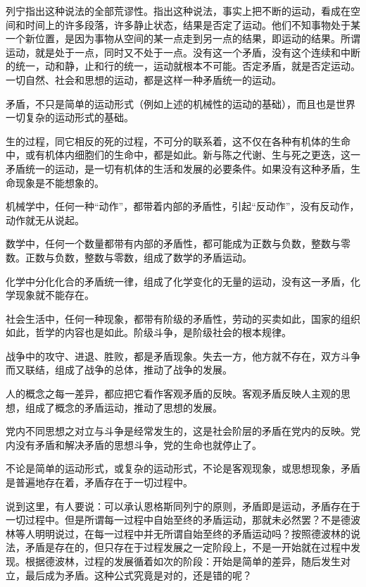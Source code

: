 \documentclass[UTF8, 12pt, a4paper]{ctexrep}
\begin{document}
列宁指出这种说法的全部荒谬性。指出这种说法，事实上把不断的运动，看成在空间和时间上的许多段落，许多静止状态，结果是否定了运动。他们不知事物处于某一个新位置，是因为事物从空间的某一点走到另一点的结果，即运动的结果。所谓运动，就是处于一点，同时又不处于一点。没有这一个矛盾，没有这个连续和中断的统一，动和静，止和行的统一，运动就根本不可能。否定矛盾，就是否定运动。一切自然、社会和思想的运动，都是这样一种矛盾统一的运动。

矛盾，不只是简单的运动形式（例如上述的机械性的运动的基础），而且也是世界一切复杂的运动形式的基础。

生的过程，同它相反的死的过程，不可分的联系着，这不仅在各种有机体的生命中，或有机体内细胞们的生命中，都是如此。新与陈之代谢、生与死之更迭，这一矛盾统一的运动，是一切有机体的生活和发展的必要条件。如果没有这种矛盾，生命现象是不能想象的。

机械学中，任何一种“动作”，都带着内部的矛盾性，引起“反动作”，没有反动作，动作就无从说起。

数学中，任何一个数量都带有内部的矛盾性，都可能成为正数与负数，整数与零数。正数与负数，整数与零数，组成了数学的矛盾运动。

化学中分化化合的矛盾统一律，组成了化学变化的无量的运动，没有这一矛盾，化学现象就不能存在。

社会生活中，任何一种现象，都带有阶级的矛盾性，劳动的买卖如此，国家的组织如此，哲学的内容也是如此。阶级斗争，是阶级社会的根本规律。

战争中的攻守、进退、胜败，都是矛盾现象。失去一方，他方就不存在，双方斗争而又联结，组成了战争的总体，推动了战争的发展。

人的概念之每一差异，都应把它看作客观矛盾的反映。客观矛盾反映人主观的思想，组成了概念的矛盾运动，推动了思想的发展。

党内不同思想之对立与斗争是经常发生的，这是社会阶层的矛盾在党内的反映。党内没有矛盾和解决矛盾的思想斗争，党的生命也就停止了。

不论是简单的运动形式，或复杂的运动形式，不论是客观现象，或思想现象，矛盾是普遍地存在着，矛盾存在于一切过程中。

说到这里，有人要说：可以承认恩格斯同列宁的原则，矛盾即是运动，矛盾存在于一切过程中。但是所谓每一过程中自始至终的矛盾运动，那就未必然罢？不是德波林等人明明说过，在每一过程中并无所谓自始至终的矛盾运动吗？按照德波林的说法，矛盾是存在的，但只存在于过程发展之一定阶段上，不是一开始就在过程中发现。根据德波林，过程的发展循着如次的阶段：开始是简单的差异，随后发生对立，最后成为矛盾。这种公式究竟是对的，还是错的呢？
\end{document}
